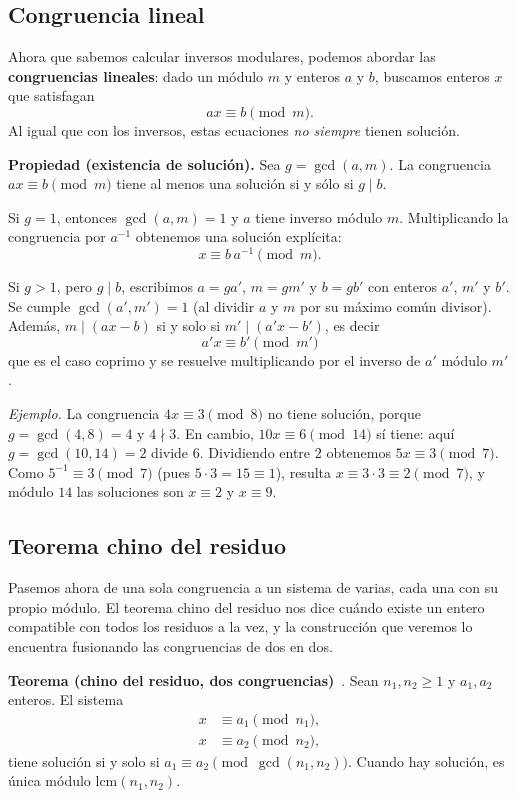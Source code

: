 \subsection*{Congruencia lineal}

Ahora que sabemos calcular inversos modulares, podemos abordar las \textbf{congruencias lineales}: dado un módulo $m$ y enteros $a$ y $b$, buscamos enteros $x$ que satisfagan
\[
ax \equiv b \pmod{m}.
\]
Al igual que con los inversos, estas ecuaciones \emph{no siempre} tienen solución.

\textbf{Propiedad (existencia de solución).} Sea $g = \gcd(a,m)$. La congruencia $ax \equiv b \pmod{m}$ tiene al menos una solución si y sólo si $g \mid b$.

Si $g = 1$, entonces $\gcd(a,m)=1$ y $a$ tiene inverso módulo $m$. Multiplicando la congruencia por $a^{-1}$ obtenemos una solución explícita:
\[
x \equiv b\,a^{-1} \pmod{m}.
\]

Si $g > 1$, pero $g \mid b$, escribimos $a = g a'$, $m = g m'$ y $b = g b'$ con enteros $a'$, $m'$ y $b'$. Se cumple $\gcd(a',m') = 1$ (al dividir $a$ y $m$ por su máximo común divisor). Además, $m \mid (ax-b)$ si y solo si $m' \mid (a'x-b')$, es decir
\[
a' x \equiv b' \pmod{m'}
\]
que es el caso coprimo y se resuelve multiplicando por el inverso de $a'$ módulo $m'$.

\textit{Ejemplo.} La congruencia $4x \equiv 3 \pmod{8}$ no tiene solución, porque $g = \gcd(4,8) = 4$ y $4 \nmid 3$. En cambio, $10x \equiv 6 \pmod{14}$ sí tiene: aquí $g = \gcd(10,14) = 2$ divide $6$. Dividiendo entre $2$ obtenemos $5x \equiv 3 \pmod{7}$. Como $5^{-1} \equiv 3 \pmod{7}$ (pues $5\cdot 3 = 15 \equiv 1$), resulta $x \equiv 3\cdot 3 \equiv 2 \pmod{7}$, y módulo $14$ las soluciones son $x \equiv 2$ y $x \equiv 9$.

\subsection*{Teorema chino del residuo}

Pasemos ahora de una sola congruencia a un sistema de varias, cada una con su propio módulo. El teorema chino del residuo nos dice cuándo existe un entero compatible con todos los residuos a la vez, y la construcción que veremos lo encuentra fusionando las congruencias de dos en dos.

\textbf{Teorema (chino del residuo, dos congruencias)}~\cite{cf_crt}. Sean $n_1,n_2 \ge 1$ y $a_1,a_2$ enteros. El sistema
\begin{align*}
x &\equiv a_1 \pmod{n_1}, \\
x &\equiv a_2 \pmod{n_2},
\end{align*}
tiene solución si y solo si $a_1 \equiv a_2 \pmod{\gcd(n_1,n_2)}$. Cuando hay solución, es única módulo $\text{lcm}(n_1,n_2)$.

